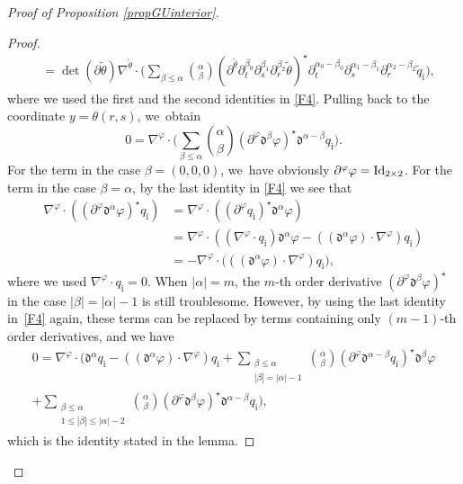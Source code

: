 \documentclass[JEP,XML,SOM,Unicode,NoFloatCountersInSection,published]{cedram}
\newcommand{\dt}{\partial_t}
\theoremstyle{definition}
\begin{document}
\begin{proof}[Proof of Proposition \ref{propGUinterior}]
\begin{proof}
\begin{align*}
&= \det(\partial\tilde{\theta})\nabla^{\tilde{\theta}}\cdot\biggl(\sum_{\beta\leq\alpha} \binom{\alpha}{\beta}
(\partial^{\tilde{\theta}}\dt^{\beta_0}\partial_s^{\beta_1}\partial_r^{\beta_2}\tilde{\theta})^\star
\dt^{\alpha_0-\beta_0}\partial_s^{\alpha_1-\beta_1}\partial_r^{\alpha_2-\beta_2}\tilde{q}_\mathrm{i} \biggr),
\end{align*}
where we used the first and the second identities in \eqref{F4}.
Pulling back to the coordinate $y=\theta(r,s)$, we~obtain
\[
0 = \nabla^\varphi\cdot\biggl(\sum_{\beta\leq\alpha} \binom{\alpha}{\beta}
(\partial^\varphi\mathfrak{d}^{\beta}\varphi)^\star \mathfrak{d}^{\alpha-\beta} q_\mathrm{i} \biggr).
\]
For the term in the case $\beta=(0,0,0)$, we~have obviously $\partial^\varphi\varphi={\rm Id}_{2\times2}$.
For the term in the case $\beta=\alpha$, by the last identity in \eqref{F4} we see that
\begin{align*}
\nabla^\varphi\cdot((\partial^\varphi\mathfrak{d}^{\alpha}\varphi)^\star q_\mathrm{i})
&= \nabla^\varphi\cdot ((\partial^\varphi q_\mathrm{i})^\star\mathfrak{d}^{\alpha}\varphi) \\
&= \nabla^\varphi\cdot ((\nabla^\varphi\cdot q_\mathrm{i})\mathfrak{d}^{\alpha}\varphi - ((\mathfrak{d}^{\alpha}\varphi)\cdot\nabla^\varphi)q_\mathrm{i}) \\
&= -\nabla^\varphi\cdot \bigl(((\mathfrak{d}^{\alpha}\varphi)\cdot\nabla^\varphi)q_\mathrm{i} \bigr),
\end{align*}
where we used $\nabla^\varphi\cdot q_\mathrm{i}=0$.
When $|\alpha|=m$, the $m$-th order derivative $(\partial^\varphi\mathfrak{d}^{\beta}\varphi)^\star$ in the case $|\beta|=|\alpha|-1$ is still troublesome.
However, by using the last identity in~\eqref{F4} again, these terms can be replaced by terms containing only $(m-1)$-th order derivatives,
and we have
\begin{multline*}
0 = \nabla^\varphi\cdot\biggl(\mathfrak{d}^{\alpha} q_\mathrm{i} - ((\mathfrak{d}^{\alpha}\varphi)\cdot\nabla^\varphi)q_\mathrm{i}
+ \sum_{\substack{\beta\leq\alpha\\ |\beta|=|\alpha|-1}}\binom{\alpha}{\beta} (\partial^\varphi\mathfrak{d}^{\alpha-\beta} q_\mathrm{i})^\star \mathfrak{d}^{\beta}\varphi \\[-10pt]
+ \sum_{\substack{\beta\leq\alpha\\ 1 \leq |\beta| \leq |\alpha|-2}} \binom{\alpha}{\beta}
(\partial^\varphi\mathfrak{d}^{\beta}\varphi)^\star \mathfrak{d}^{\alpha-\beta} q_\mathrm{i} \biggr),
\end{multline*}
which is the identity stated in the lemma.
\end{proof}


\end{proof}
\end{document}
